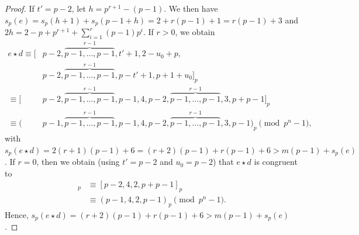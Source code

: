 \documentclass[12pt]{article}
\newcommand{\wt}{s_p}
\begin{document}
\begin{proof}
If $t' = p-2$, let $h = p^{r + 1} - (p - 1)$. We then have $\wt(e) = \wt(h+1) + \wt(p-1+h) = 2 + r(p-1) + 1 = r(p-1) + 3$ and $2h = 2 - p + p^{r+1} + \sum_{i=1}^r(p-1)p^i$. If $r>0$, we obtain
\begin{align*}
    e \star d \equiv [&p-2,\overbrace{p-1,\dots,p-1}^{r-1},t'+1, 2-u_0+p,\\
    &p-2,\overbrace{p-1,\dots,p-1}^{r-1},p-t'+1, p+1+u_0]_p \\
    \equiv [&p-2,\overbrace{p-1,\dots,p-1}^{r-1},p-1, 4,p-2,\overbrace{p-1,\dots,p-1}^{r-1},3, p+p-1]_p \\
    \equiv (&p-1,\overbrace{p-1,\dots,p-1}^{r-1},p-1, 4,p-2,\overbrace{p-1,\dots,p-1}^{r-1},3,p-1)_p \pmod {p^n-1},
\end{align*}
with $\wt(e \star d) = 2(r+1)(p-1)+6 = (r+2)(p-1) + r(p-1)+6 > m(p - 1) + \wt(e)$. If $r = 0$, then we obtain (using $t' = p - 2$ and $u_0 = p - 2$) that $e \star d$ is congruent to
\begin{align*}
    [t', 2-u_0+p,p-t', p+1+u_0]_p &\equiv [p-2, 4,2, p+p-1]_p \\
    &\equiv (p-1, 4,2, p-1)_p \pmod {p^n-1}.
\end{align*}
Hence, $\wt(e \star d) = (r+2)(p-1) + r(p-1) + 6 > m(p - 1) + \wt(e)$.


\end{proof}
\end{document}
